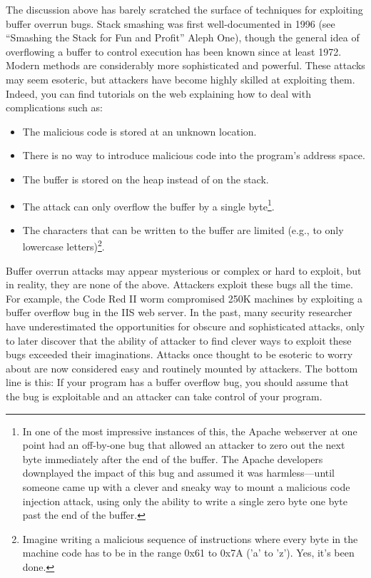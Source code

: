 \documentclass[11pt]{article}
\begin{document}
The discussion above has barely scratched
the surface of techniques for exploiting buffer overrun bugs. Stack
smashing was first well-documented in 1996 (see ``Smashing the Stack for Fun
and Profit'' Aleph One), though the general idea of overflowing a buffer to
control execution has been known since at least 1972. 
Modern methods are considerably more
sophisticated and powerful. These attacks may seem esoteric, but
attackers have become highly skilled at exploiting them. Indeed, you
can find tutorials on the web explaining how to deal with
complications such as:
\begin{itemize}
\item The malicious code is stored at an unknown
location.
\item There is no way to introduce malicious code into the
program's address space.
\item The buffer is stored on the heap instead of
on the stack.
\item The attack can only overflow the buffer by a single
  byte\footnote{In one of the most impressive instances of this, 
    the Apache webserver at one point had an off-by-one bug
    that allowed an attacker to zero out the next byte immediately
    after the end of the buffer. The Apache developers downplayed the
    impact of this bug and assumed it was harmless---until someone came
    up with a clever and sneaky way to mount a malicious code
    injection attack, using only the ability to write a single zero
    byte one byte past the end of the buffer.}.
\item The characters that can be written to the buffer are limited
  (e.g., to only lowercase letters)\footnote{Imagine writing a
    malicious sequence of instructions where every byte in the
    machine code has to be in the range 0x61 to 0x7A ('a' to
    'z'). Yes, it’s been done.}.  
\end{itemize}

Buffer overrun attacks may appear mysterious or complex or hard to
exploit, but in reality, they are none of the above. Attackers exploit
these bugs all the time. For example, the Code Red II worm compromised
250K machines by exploiting a buffer overflow bug in the IIS web
server. In the past, many security researcher have underestimated the
opportunities for obscure and sophisticated attacks, only to later
discover that the ability of attacker to find clever ways to exploit
these bugs exceeded their imaginations. Attacks once thought to be
esoteric to worry about are now considered easy and routinely mounted
by attackers. The bottom line is this: If your program has a buffer
overflow bug, you should assume that the bug is exploitable and an
attacker can take control of your program.  
\end{document}
